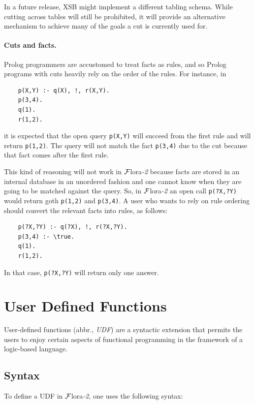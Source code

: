 \documentclass[11pt]{article}
\newcommand{\FLORA}{{\mbox{\sc ${\cal F}${lora}\rm\emph{-2}}}\xspace}
\newcommand{\FLSYSTEM}{\FLORA}
\newcommand{\bs}{\textbackslash}
\begin{document}
In a future release, XSB might implement a different tabling schema. While
cutting across tables will still be prohibited, it will provide an
alternative mechanism to achieve many of the goals a cut is currently
used for.

\paragraph{Cuts and facts.}
Prolog programmers are accustomed
to treat facts as rules, and so Prolog programs
with cuts heavily rely on the order of the rules. For instance, in
\begin{verbatim}
    p(X,Y) :- q(X), !, r(X,Y).
    p(3,4).
    q(1).
    r(1,2).
\end{verbatim}
it is expected that the open query \texttt{p(X,Y)} will succeed from the
first rule and will return \texttt{p(1,2)}. The query will not match  
the fact \texttt{p(3,4)} due to the cut because that fact comes after the
first rule.

This kind of reasoning will not work in \FLSYSTEM because facts are stored in
an internal database in an unordered fashion and one cannot know when they
are going to be matched against the query. So, in \FLSYSTEM an open call
\texttt{p(?X,?Y)} would return goth \texttt{p(1,2)} and \texttt{p(3,4)}.
A user who wants to rely on rule ordering should convert the relevant
facts into rules, as follows:
\begin{verbatim}
    p(?X,?Y) :- q(?X), !, r(?X,?Y).
    p(3,4) :- \true.
    q(1).
    r(1,2).
\end{verbatim}
In that case, \texttt{p(?X,?Y)} will return only one answer.


\section{User Defined Functions} \label{sec:udf}


User-defined functions (abbr., \emph{UDF}) are a syntactic extension that permits
the users to enjoy certain aspects of functional programming in the
framework of a logic-based language.
 

\subsection{Syntax}\label{sec-udf}
\index{UDF! \bs{}if}
\index{\bs{}if!in UDF definitions}
To define a UDF in
\FLSYSTEM, one uses the following syntax:
\end{document}
